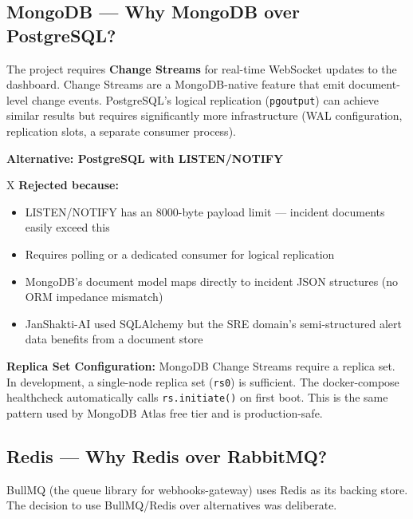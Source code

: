 \documentclass[11pt,a4paper]{article}
\begin{document}
\subsection{MongoDB — Why MongoDB over PostgreSQL?}

\begin{decisionbox}
The project requires \textbf{Change Streams} for real-time WebSocket updates to the dashboard.
Change Streams are a MongoDB-native feature that emit document-level change events. PostgreSQL's
logical replication (\texttt{pgoutput}) can achieve similar results but requires significantly
more infrastructure (WAL configuration, replication slots, a separate consumer process).
\end{decisionbox}

\begin{alternativebox}
\textbf{Alternative: PostgreSQL with LISTEN/NOTIFY}

X \textbf{Rejected because:}
\begin{itemize}[leftmargin=*,itemsep=2pt]
  \item LISTEN/NOTIFY has an 8000-byte payload limit — incident documents easily exceed this
  \item Requires polling or a dedicated consumer for logical replication
  \item MongoDB's document model maps directly to incident JSON structures (no ORM impedance mismatch)
  \item JanShakti-AI used SQLAlchemy but the SRE domain's semi-structured alert data benefits from a document store
\end{itemize}
\end{alternativebox}

\begin{techbox}
\textbf{Replica Set Configuration:} MongoDB Change Streams require a replica set. In development,
a single-node replica set (\texttt{rs0}) is sufficient. The docker-compose healthcheck
automatically calls \texttt{rs.initiate()} on first boot. This is the same pattern used
by MongoDB Atlas free tier and is production-safe.
\end{techbox}

\subsection{Redis — Why Redis over RabbitMQ?}

\begin{decisionbox}
BullMQ (the queue library for webhooks-gateway) uses Redis as its backing store. The
decision to use BullMQ/Redis over alternatives was deliberate.
\end{decisionbox}
\end{document}
